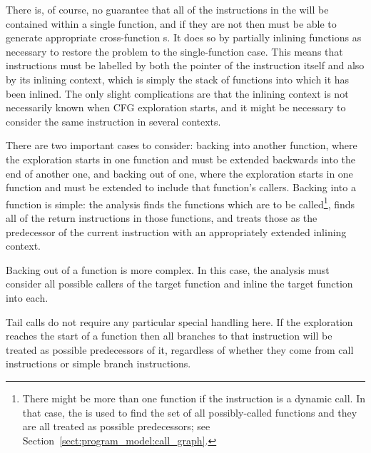 \label{sect:derive:cross_function_cfgs}

There is, of course, no guarantee that all of the instructions in the
 will be contained within a single function,
and if they are not then {\technique} must be able to generate
appropriate cross-function s.  It does so by partially
inlining functions as necessary to restore the problem to the
single-function case.  This means that instructions must be labelled
by both the pointer of the instruction itself and also by its inlining
context, which is simply the stack of functions into which it has been
inlined.  The only slight complications
are that the inlining context is not necessarily known when CFG
exploration starts, and it might be necessary to consider the same
instruction in several contexts.


There are two important cases to consider: backing into another
function, where the exploration starts in one function and must be
extended backwards into the end of another one, and backing out of
one, where the exploration starts in one function and must be extended
to include that function's callers.  Backing into a function is
simple: the analysis finds the functions which are to be
called\footnote{There might be more than one function if the
  instruction is a dynamic call.  In that case, the  is used to find the set of all possibly-called functions
  and they are all treated as possible predecessors; see
  Section~\ref{sect:program_model:call_graph}.}, finds all of the
return instructions in those functions, and treats those as the
predecessor of the current instruction with an appropriately extended
inlining context.

Backing out of a function is more complex.  In this case, the analysis
must consider all possible callers of the target function and inline
the target function into each.  


Tail calls do not require any particular special handling here.  If
the exploration reaches the start of a function then all branches to
that instruction will be treated as possible predecessors of it,
regardless of whether they come from call instructions or simple
branch instructions.

